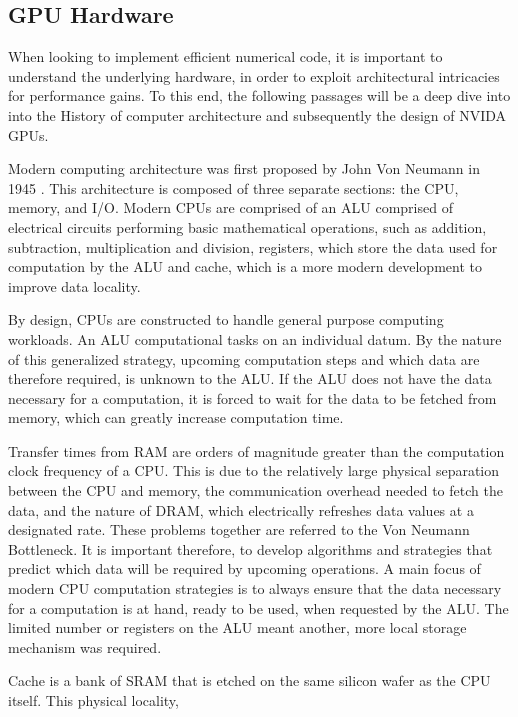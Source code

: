 \subsection{GPU Hardware}
When looking to implement efficient numerical code, it is important to understand
 the underlying hardware, in order to exploit architectural intricacies for performance gains.
 To this end, the following passages will be a deep dive into into the History of
 computer architecture and subsequently the design of NVIDA \Glspl{GPU}.
\par
Modern computing architecture was first proposed by John Von Neumann in 1945 \cite{vonNeumann}.
This architecture is composed of three separate sections: the \Gls{CPU}, memory, and \Gls{I/O}.
Modern \Glspl{CPU} are comprised of an \Gls{ALU} comprised of electrical circuits
performing basic mathematical operations, such as addition, subtraction, multiplication and division,
registers, which store the data used for computation by the ALU and cache, which is a more modern development to improve data locality.
\par
By design, \Glspl{CPU} are constructed
to handle general purpose computing workloads.
An \Gls{ALU} computational
tasks on an individual datum. By the nature of this
generalized strategy, upcoming computation steps and which data are therefore required,
is unknown to the \Gls{ALU}. If the ALU does not have the data necessary for a computation,
it is forced to wait for the data to be fetched from memory, which can greatly increase computation time.
\par
Transfer times from \Gls{RAM}
are orders of magnitude greater than the computation clock frequency of
a CPU.  This is due to the relatively large physical separation between the CPU and memory,
 the communication overhead needed to fetch the data, and
the nature of \Gls{DRAM}, which electrically refreshes data values at a designated rate.
These problems together are referred to the Von Neumann Bottleneck\cite{Backus}.
It is important therefore, to develop algorithms and strategies that  predict which data will be required by upcoming operations.
A main focus of modern CPU computation strategies is to always ensure that the data
necessary for a computation is at hand, ready to be used, when requested by the \Gls{ALU}.
The limited number or registers on the ALU meant another, more local storage mechanism
was required.
\par
Cache is a bank of \Gls{SRAM}
that is etched on the same silicon wafer as the CPU itself.  This physical locality,
